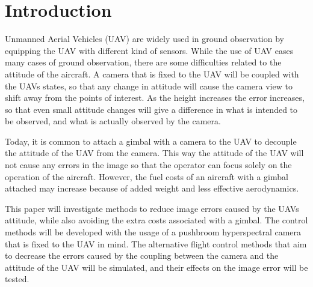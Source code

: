 \section{Introduction}

Unmanned Aerial Vehicles (UAV) are widely used in ground observation by equipping the UAV with different kind of sensors. While the use of UAV eases many cases of ground observation, there are some difficulties related to the attitude of the aircraft. A camera that is fixed to the UAV will be coupled with the UAVs states, so that any change in attitude will cause the camera view to shift away from the points of interest. As the height increases the error increases, so that even small attitude changes will give a difference in what is intended to be observed, and what is actually observed by the camera.

Today, it is common to attach a gimbal with a camera to the UAV to decouple the attitude of the UAV from the camera. This way the attitude of the UAV will not cause any errors in the image so that the operator can focus solely on the operation of the aircraft. However, the fuel costs of an aircraft with a gimbal attached may increase because of added weight and less effective aerodynamics.

This paper will investigate methods to reduce image errors caused by the UAVs attitude, while also avoiding the extra costs associated with a gimbal. The control methods will be developed with the usage of a pushbroom hyperspectral camera that is fixed to the UAV in mind. The alternative flight control methods that aim to decrease the errors caused by the coupling between the camera and the attitude of the UAV will be simulated, and their effects on the image error will be tested.